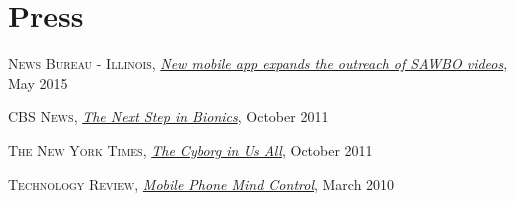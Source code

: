 \section{\sc Press}
\textsc{News Bureau - Illinois}, \href{http://news.illinois.edu/news/15/0515SAWBO_app_BarryPittendrigh.html}{\emph{New mobile app expands the outreach of SAWBO videos}}, May 2015
\vspace*{-2.5mm}

\textsc{CBS News}, \href{http://www.cbsnews.com/stories/2011/10/09/sunday/main20117796.shtml}{\emph{The Next Step in Bionics}}, October 2011
\vspace*{-2.5mm}

\textsc{The New York Times}, \href{http://www.nytimes.com/2011/09/18/magazine/the-cyborg-in-us-all.html}{\emph{The Cyborg in Us All}}, October 2011
\vspace*{-2.5mm}

\textsc{Technology Review}, \href{http://www.technologyreview.com/blog/editors/24993/}{\emph{Mobile Phone Mind Control}}, March 2010
